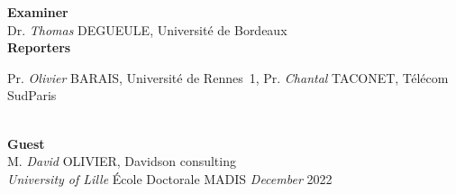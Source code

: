 \begin{center}
    \large
    \textbf{Examiner}\\
    \normalsize
    \vspace{.5cm}
    Dr. \emph{Thomas} \textsc{DEGUEULE}, Université de Bordeaux
    \endminipage
    \vspace{.5cm}
    \\
    \large
    \textbf{Reporters}\\

    \vspace{.5cm}
    \normalsize
    Pr. \emph{Olivier} \textsc{BARAIS}, Université de Rennes~1,\newline
    Pr. \emph{Chantal} \textsc{TACONET}, Télécom SudParis

    \endminipage
    \vspace{0.6cm}
    \\
    \large
    \textbf{Guest}\\
    \normalsize
    \vspace{.5cm}
    M. \emph{David} OLIVIER, Davidson consulting
    \endminipage
    \vspace{0.8cm}
    \\
    \large
    \emph{University of Lille}
    \'Ecole Doctorale MADIS
    \endminipage
    \emph{December} 2022
    \endminipage



\end{center}